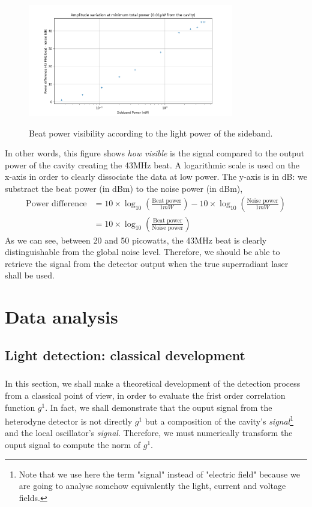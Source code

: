 \documentclass[12pt]{report}
\begin{document}
\begin{figure}[h!]
\caption{Beat power visibility according to the light power of the sideband.}
\centering
\includegraphics[width=0.8\textwidth]{sb-power-visibility}
\label{fig:sb-power-visibility}
\end{figure}

In other words, this figure shows \textit{how visible} is the signal compared to the output power of the cavity creating the 43MHz beat. A logarithmic scale is used on the x-axis in order to clearly dissociate the data at low power. The y-axis is in dB: we substract the beat power (in dBm) to the noise power (in dBm),
\begin{align}
\textrm{Power difference} &= 10 \times \log_{10}\left( \frac{\textrm{Beat power}}{1mW} \right) - 10 \times \log_{10}\left( \frac{\textrm{Noise power}}{1mW} \right) \\
&= 10 \times \log_{10}\left( \frac{\textrm{Beat power}}{\textrm{Noise power}} \right)
\end{align}
As we can see, between 20 and 50 picowatts, the 43MHz beat is clearly distinguishable from the global noise level. Therefore, we should be able to retrieve the signal from the detector output when the true superradiant laser shall be used.

\chapter{Data analysis}
\section{Light detection: classical development}
\paragraph{}

In this section, we shall make a theoretical development of the detection process from a classical point of view, in order to evaluate the frist order correlation function $g^1$. In fact, we shall demonstrate that the ouput signal from the heterodyne detector is not directly $g^1$ but a composition of the cavity's \textit{signal}\footnote{Note that we use here the term "signal" instead of "electric field" because we are going to analyse somehow equivalently the light, current and voltage fields.} and the local oscillator's \textit{signal}. Therefore, we must numerically transform the ouput signal to compute the norm of $g^1$.
\end{document}
